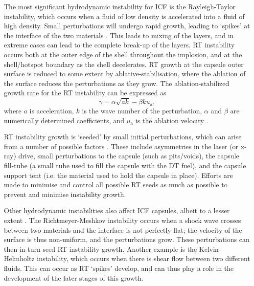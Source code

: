 The most significant hydrodynamic instability for ICF is the Rayleigh-Taylor instability, which occurs when a fluid of low density is accelerated into a fluid of high density. Small perturbations will undergo rapid growth, leading to `spikes' at the interface of the two materials \cite{Atzeni2008}. This leads to mixing of the layers, and in extreme cases can lead to the complete break-up of the layers. RT instability occurs both at the outer edge of the shell throughout the implosion, and at the shell/hotspot boundary as the shell decelerates. RT growth at the capsule outer surface is reduced to some extent by ablative-stabilisation, where the ablation of the surface reduces the perturbations as they grow. The ablation-stabilized growth rate for the RT instability can be expressed as
\begin{equation} \gamma = \alpha \sqrt{ak} - \beta k u_\mathrm{a}, \label{eq:RTI} \end{equation}
where $a$ is acceleration, $k$ is the wave number of the perturbation, $\alpha$ and $\beta$ are numerically determined coefficients, and $u_\mathrm{a}$ is the ablation velocity \cite{Takabe1985, Betti1998}.

RT instability growth is `seeded' by small initial perturbations, which can arise from a number of possible factors \cite{Haines2019a}. These include asymmetries in the laser (or x-ray) drive, small perturbations to the capsule (such as pits/voids), the capsule fill-tube (a small tube used to fill the capsule with the DT fuel), and the capsule support tent (i.e. the material used to hold the capsule in place). Efforts are made to minimise and control all possible RT seeds as much as possible to prevent and minimise instability growth.

Other hydrodynamic instabilities also affect ICF capsules, albeit to a lesser extent \cite{Atzeni2008}. The Richtmeyer-Meshkov instability occurs when a shock wave crosses between two materials and the interface is not-perfectly flat; the velocity of the surface is thus non-uniform, and the perturbations grow. These perturbations can then in-turn seed RT instability growth. Another example is the Kelvin-Helmholtz instability, which occurs when there is shear flow between two different fluids. This can occur as RT `spikes' develop, and can thus play a role in the development of the later stages of this growth.

